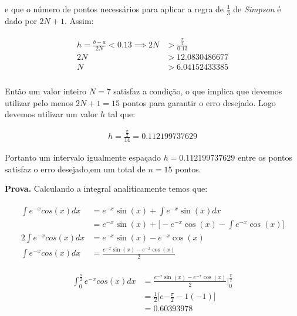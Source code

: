 \documentclass[paper=a4, fontsize=12pt]{scrartcl}
\numberwithin{equation}{section} %
\numberwithin{figure}{section} %
\numberwithin{table}{section} %
\newcommand{\euler}{e}
\begin{document}
		e que o número de pontos necessários para aplicar a regra de $\frac{1}{3}$ de \textit{Simpson} é dado por $2N + 1$. Assim:

		\begin{align*}
		\begin{split}
		h = \frac{b - a}{2N} < 0.13 \implies 2N &>	\frac{\frac{\pi}{2}}{0.13}  \\														2N &> 12.0830486677
		\\														N	&>	6.04152433385					\\
		\end{split}
		\end{align*}

		Então um valor inteiro $  N = 7  $ satisfaz a condição, o que implica que devemos utilizar pelo menos $2N + 1 = 15$ pontos para garantir o erro desejado. Logo devemos utilizar um valor $h$ tal que:

		\begin{align*}
			h = \frac{\frac{\pi}{2}}{14} = 0.112199737629
		\end{align*}


		Portanto um intervalo igualmente espaçado $h = 0.112199737629$ entre os pontos satisfaz o erro desejado,em um total de $n = 15$ pontos.

		\textbf{Prova.} Calculando a integral analiticamente temos que:

		\begin{align*}
			\begin{split}
				\int \euler^{-x}cos(x)dx &= \euler^{-x}\sin(x) + \int \euler^{-x}\sin(x) dx \\ &= \euler^{-x}\sin(x) + \Big[ -\euler^{-x}\cos(x) - \int \euler^{-x}\cos(x) \Big] \\
				2\int \euler^{-x}cos(x)dx &= \euler^{-x}\sin(x) -\euler^{-x}\cos(x) \\
				\int \euler^{-x}cos(x)dx &= \frac{\euler^{-x}\sin(x) -\euler^{-x}\cos(x)}{2}
			\end{split}
		\end{align*}

		\begin{align*}
			\begin{split}
				\int_{0}^{\frac{\pi}{2}} \euler^{-x}cos(x)dx &=  \frac{\euler^{-x}\sin(x) -\euler^{-x}\cos(x)}{2} \Big|_{0}^{\frac{\pi}{2}} \\
				&= \frac{1}{2} \Big[ \euler{-\frac{\pi}{2}} -1 (-1) \Big] \\
				&= 0.60393978
			\end{split}
		\end{align*}
\end{document}
